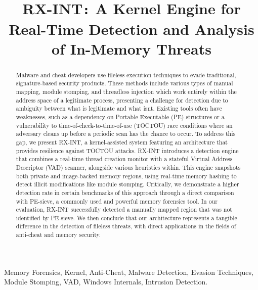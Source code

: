 \documentclass[journal]{IEEEtran}
\title{RX-INT\texttt{:} A Kernel Engine for Real-Time Detection and Analysis of In-Memory Threats}
\author{
    \IEEEauthorblockN{Arjun Juneja \\}
    \IEEEauthorblockA{School of Electronics and Computer Science\\
    University of Southampton\\
    aj2g24@soton.ac.uk}
}
\begin{document}
\maketitle

\begin{abstract}
Malware and cheat developers use fileless execution techniques to evade traditional, signature-based security products. These methods include various types of manual mapping, module stomping, and threadless injection which work entirely within the address space of a legitimate process, presenting a challenge for detection due to ambiguity between what is legitimate and what isnt. Existing tools often have weaknesses, such as a dependency on Portable Executable (PE) structures or a vulnerability to time-of-check-to-time-of-use (TOCTOU) race conditions where an adversary cleans up before a periodic scan has the chance to occur. To address this gap, we present RX-INT, a kernel-assisted system featuring an architecture that provides resilience against TOCTOU attacks. RX-INT introduces a detection engine that combines a real-time thread creation monitor with a stateful Virtual Address Descriptor (VAD) scanner, alongside various heuristics within. This engine snapshots both private and image-backed memory regions, using real-time memory hashing to detect illicit modifications like module stomping. Critically, we demonstrate a higher detection rate in certain benchmarks of this approach through a direct comparison with PE-sieve, a commonly used and powerful memory forensics tool. In our evaluation, RX-INT successfully detected a manually mapped region that was not identified by PE-sieve. We then conclude that our architecture represents a tangible difference in the detection of fileless threats, with direct applications in the fields of anti-cheat and memory security.
\end{abstract}

\begin{IEEEkeywords}
Memory Forensics, Kernel, Anti-Cheat, Malware Detection, Evasion Techniques, Module Stomping, VAD, Windows Internals, Intrusion Detection.
\end{IEEEkeywords}
\end{document}
